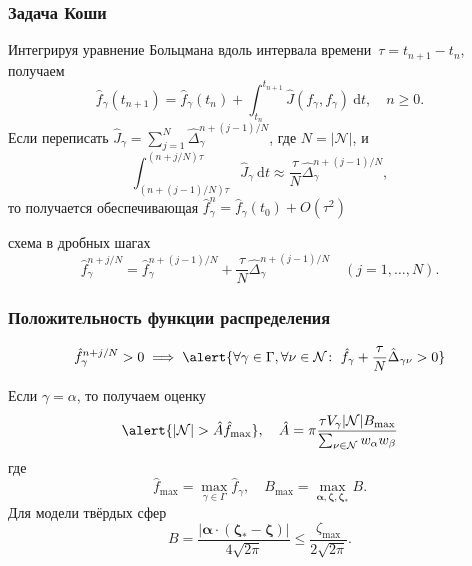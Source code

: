 \documentclass[mathserif]{beamer} %
\newcommand{\dd}{\:\mathrm{d}}
\newcommand{\bzeta}{\boldsymbol{\zeta}}
\newcommand{\Nu}{\mathcal{N}}
\newcommand{\OO}[1]{O(#1)}
\begin{document}
\begin{frame}
    \frametitle{Задача Коши}
    Интегрируя уравнение Больцмана вдоль интервала времени~\(\tau = t_{n+1} - t_n\), получаем
    \begin{equation}\label{eq:time_scheme}
        \hat{f}_\gamma(t_{n+1}) = \hat{f}_\gamma(t_n) + \int_{t_n}^{t_{n+1}} \hat{J}(f_\gamma, f_\gamma) \dd{t},
        \quad n\ge0.
    \end{equation}
    Если переписать \(\hat{J}_{\gamma} = \sum_{j=1}^N \hat{\Delta}_{\gamma}^{n+(j-1)/N}\), где \(N=|\Nu|\), и
    \begin{equation}\label{eq:discrete_short_ci}
        \int_{(n+(j-1)/N)\tau}^{(n+j/N)\tau}\hat{J}_\gamma\dd{t} \approx
            \frac{\tau}{N} \hat{\Delta}_{\gamma}^{n+(j-1)/N},
    \end{equation}
    \pause
    то получается обеспечивающая \(\hat{f}_\gamma^n = \hat{f}_\gamma(t_0) + \OO{\tau^2}\)
    \begin{block}{схема в дробных шагах}
        \vspace{-5pt}
        \begin{equation}\label{eq:fractional_step_scheme}
            \hat{f}_\gamma^{n+j/N} = \hat{f}_\gamma^{n+(j-1)/N} + \frac{\tau}{N}\hat{\Delta}_{\gamma}^{n+(j-1)/N}
            \quad (j = 1,\dotsc,N).
        \end{equation}
        \vspace{-10pt}
    \end{block}
\end{frame}

\begin{frame}
    \frametitle{Положительность функции распределения}
    \begin{block}{}
        \vspace{-5pt}
        \begin{equation}\label{eq:positive_f}
            \hat{f}_\gamma^{n+j/N} > 0 \implies \alert{ \forall \gamma\in\Gamma, \forall\nu\in\Nu\!: \
                \hat{f}_\gamma + \frac{\tau}{N}\hat{\Delta}_{\gamma\nu} > 0 }
        \end{equation}
        \vspace{-10pt}
    \end{block}
    \vspace{20pt}\pause

    Если \(\gamma = \alpha\), то получаем оценку
    \begin{equation}\label{eq:positive_f_alpha}
        \alert{ |\Nu| > \hat{A} \hat{f}_{\max} }, \quad
        \hat{A} = \pi\frac{\tau V_\gamma|\Nu| B_{\max}}{\sum_{\nu\in\Nu} w_{\alpha}w_{\beta}}
    \end{equation}
    где
    \begin{equation}\label{eq:hat_f_max}
        \hat{f}_{\max} = \max_{\gamma\in\Gamma} \hat{f}_\gamma, \quad
        B_{\max} = \max_{\boldsymbol\alpha, \bzeta, \bzeta_*} B.
    \end{equation}
    Для модели твёрдых сфер
    \begin{equation}\label{eq:B_HS}
        B = \frac{|\boldsymbol\alpha\cdot(\bzeta_*-\bzeta)|}{4\sqrt{2\pi}} \leq \frac{\zeta_{\max}}{2\sqrt{2\pi}}.
    \end{equation}
\end{frame}
\end{document}

